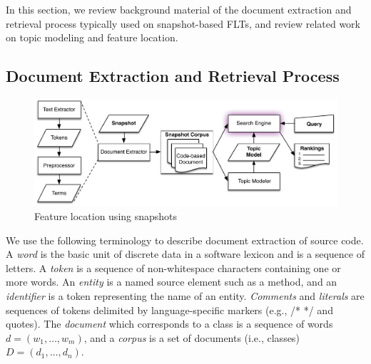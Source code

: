 

In this section, we review background material of the document extraction and retrieval process
typically used on snapshot-based FLTs,
and review related work on topic modeling and feature location.

\subsection{Document Extraction and Retrieval Process}

\begin{figure}
\centerline{\includegraphics[width=.75\textwidth]{figures/snapshot-flt}}
\caption{Feature location using snapshots}
\label{fig:snapshot}
\end{figure}

We use the following terminology to describe document extraction of source code.
A \textit{word} is the basic unit of discrete data in a software lexicon and is a sequence of letters.
A \textit{token} is a sequence of non-whitespace characters containing one or more words.
An \textit{entity} is a named source element such as a method,
and an \textit{identifier} is a token representing the name of an entity.
\textit{Comments} and \textit{literals} are sequences of tokens delimited by language-specific markers (e.g., /* */ and quotes).
The \textit{document} which corresponds to a class is a sequence of words $d = (w_1, \ldots, w_m)$,
and a \textit{corpus} is a set of documents (i.e., classes) $D = (d_1, \ldots, d_n)$.

